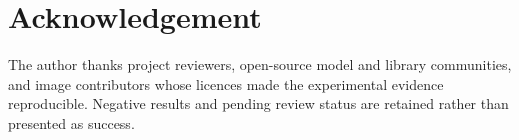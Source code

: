 \chapter*{Acknowledgement}
The author thanks project reviewers, open-source model and library communities, and image contributors whose licences made the experimental evidence reproducible. Negative results and pending review status are retained rather than presented as success.
\clearpage
